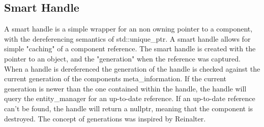 
\subsection{Smart Handle}



A smart handle is a simple wrapper for an non owning pointer to a component, with the dereferencing semantics of std::unique\_ptr. 
A smart handle allows for simple "caching" of a component reference.
The smart handle is created with the pointer to an object, 
and the "generation" when the reference was captured. 
When a handle is dereferenced the generation of the handle is checked against the current generation of the components meta\_information. 
If the current generation is newer than the one contained within the handle, 
the handle will query the entity\_manager for an up-to-date reference.
If an up-to-date reference can't be found, 
the handle will return a nullptr, meaning that the component is destroyed.
The concept of generations was inspired by Reinalter\cite{molecular_musings_internal_references}.

